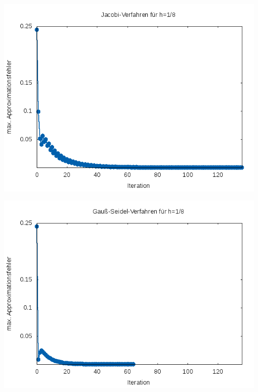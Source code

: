 \documentclass{article}
\begin{document}
\begin{center}
\includegraphics[scale=0.8]{bilder/fehler_jacobi_1_8.png}
\end{center}

\begin{center}
\includegraphics[scale=0.8]{bilder/fehler_gs_1_8.png}
\end{center}
\end{document}
